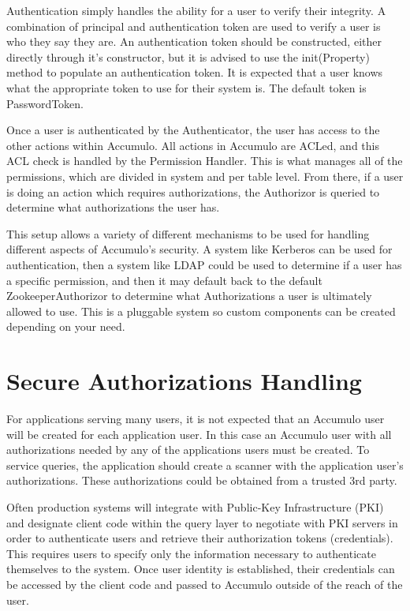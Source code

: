 Authentication simply handles the ability for a user to verify their integrity. A combination of 
principal and authentication token are used to verify a user is who they say they are. An 
authentication token should be constructed, either directly through it's constructor, but it is 
advised to use the init(Property) method to populate an authentication token. It is expected that a 
user knows what the appropriate token to use for their system is. The default token is 
PasswordToken. 

Once a user is authenticated by the Authenticator, the user has access to the other actions within 
Accumulo. All actions in Accumulo are ACLed, and this ACL check is handled by the Permission 
Handler. This is what manages all of the permissions, which are divided in system and per table 
level. From there, if a user is doing an action which requires authorizations, the Authorizor is 
queried to determine what authorizations the user has.

This setup allows a variety of different mechanisms to be used for handling different aspects of 
Accumulo's security. A system like Kerberos can be used for authentication, then a system like LDAP 
could be used to determine if a user has a specific permission, and then it may default back to the 
default ZookeeperAuthorizor to determine what Authorizations a user is ultimately allowed to use. 
This is a pluggable system so custom components can be created depending on your need.

\section{Secure Authorizations Handling}

For applications serving many users, it is not expected that an Accumulo user
will be created for each application user. In this case an Accumulo user with
all authorizations needed by any of the applications users must be created. To
service queries, the application should create a scanner with the application
user's authorizations. These authorizations could be obtained from a trusted 3rd
party.

Often production systems will integrate with Public-Key Infrastructure (PKI) and
designate client code within the query layer to negotiate with PKI servers in order
to authenticate users and retrieve their authorization tokens (credentials). This
requires users to specify only the information necessary to authenticate themselves
to the system. Once user identity is established, their credentials can be accessed by
the client code and passed to Accumulo outside of the reach of the user.

